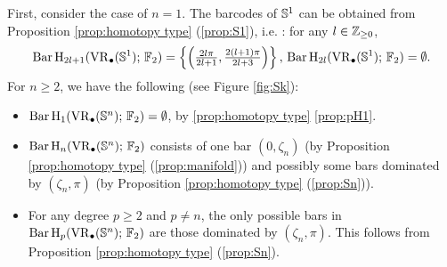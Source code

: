 First, consider the case of $n=1$.
The barcodes of $\mathbb{S}^1$ can be obtained from Proposition \ref{prop:homotopy type} (\ref{prop:S1}), i.e. \cite[Theorem 7.4]{adamaszek2017vietoris}: for any $l\in \mathbb{Z}_{\geq 0}$,
\begin{equation}\label{eq:barc of S1}
	\operatorname{Bar} \operatorname{H}_{2l+1}(\operatorname{VR}_\bullet(\mathbb{S}^1);\,{\mathbb{F}_2})=\left\{\left(\tfrac{2l\pi}{2l+1},\tfrac{2(l+1)\pi}{2l+3}\right)\right\},\, \operatorname{Bar} \operatorname{H}_{2l}(\operatorname{VR}_\bullet(\mathbb{S}^1);\,{\mathbb{F}_2})=\emptyset.
\end{equation}
For $n\geq 2$, we have the following (see Figure \ref{fig:Sk}):
\begin{itemize}
	\item $\operatorname{Bar} \operatorname{H}_{1}(\operatorname{VR}_\bullet(\mathbb{S}^n);\,{\mathbb{F}_2})=\emptyset$, by \cref{prop:homotopy type} \cref{prop:pH1}.
	\item $\operatorname{Bar} \operatorname{H}_{n}(\operatorname{VR}_\bullet(\mathbb{S}^n);\,{\mathbb{F}_2})$ consists of one bar $(0,\zeta_n)$ (by Proposition \ref{prop:homotopy type} (\ref{prop:manifold})) and possibly some bars dominated by $(\zeta_n,\pi)$ (by Proposition \ref{prop:homotopy type} (\ref{prop:Sn})).
	\item For any degree $p\geq 2$ and $p\neq n$, the only possible bars in $\operatorname{Bar} \operatorname{H}_{p}(\operatorname{VR}_\bullet(\mathbb{S}^n);\,{\mathbb{F}_2})$ are those  dominated by  $(\zeta_n,\pi)$. This follows from  Proposition \ref{prop:homotopy type} (\ref{prop:Sn}).
\end{itemize}

